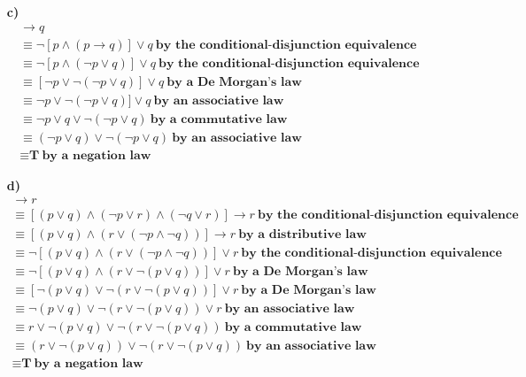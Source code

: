 \documentclass{Axon}
\begin{document}
\begin{enumerate}
    \item[\textbf{c)}]
    \begin{gather*}
        [p \land (p \to q)] \to q \\
        \equiv \lnot[p \land (p \to q)] \lor q \ \textbf{by the conditional-disjunction equivalence} \\
        \equiv \lnot[p \land (\lnot p \lor q)] \lor q \ \textbf{by the conditional-disjunction equivalence} \\
        \equiv [\lnot p \lor \lnot(\lnot p \lor q)] \lor q \ \textbf{by a De Morgan's law} \\
        \equiv \lnot p \lor \lnot(\lnot p \lor q)] \lor q \ \textbf{by an associative law} \\
        \equiv \lnot p \lor q \lor \lnot(\lnot p \lor q) \ \textbf{by a commutative law} \\
        \equiv (\lnot p \lor q) \lor \lnot(\lnot p \lor q) \ \textbf{by an associative law} \\
        \equiv \textbf{T} \ \textbf{by a negation law}
    \end{gather*}
    
    \item[\textbf{d)}]
    \begin{gather*}
        [(p \lor q) \land (p \to r) \land (q \to r)] \to r \\
        \equiv [(p \lor q) \land (\lnot p \lor r) \land (\lnot q \lor r)] \to r \ \textbf{by the conditional-disjunction equivalence} \\
        \equiv [(p \lor q) \land (r \lor (\lnot p \land \lnot q))] \to r \ \textbf{by a distributive law} \\
        \equiv \lnot[(p \lor q) \land (r \lor (\lnot p \land \lnot q))] \lor r \ \textbf{by the conditional-disjunction equivalence} \\
        \equiv \lnot[(p \lor q) \land (r \lor \lnot(p \lor q))] \lor r \ \textbf{by a De Morgan's law} \\
        \equiv [\lnot(p \lor q) \lor \lnot(r \lor \lnot(p \lor q))] \lor r \ \textbf{by a De Morgan's law} \\
        \equiv \lnot(p \lor q) \lor \lnot(r \lor \lnot(p \lor q)) \lor r \ \textbf{by an associative law} \\
        \equiv r \lor \lnot(p \lor q) \lor \lnot(r \lor \lnot(p \lor q)) \ \textbf{by a commutative law} \\
        \equiv (r \lor \lnot(p \lor q)) \lor \lnot(r \lor \lnot(p \lor q)) \ \textbf{by an associative law} \\
        \equiv \textbf{T} \ \textbf{by a negation law}
    \end{gather*}
\end{enumerate}
\end{document}
